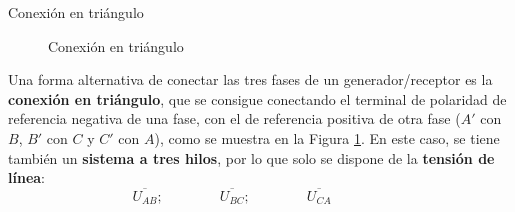 \documentclass[11pt]{book} %
\makeatletter
\numberwithin{dummy}{section}
\theoremstyle{ocrenumbox}
\theoremstyle{blacknumex}
\theoremstyle{blacknumbox}
\theoremstyle{ocrenum}
\renewcommand{\subsection}{\@startsection {subsection}{2}{\z@}
{-3ex \@plus -0.1ex \@minus -.4ex}
{0.5ex \@plus.2ex }
{\normalfont\sffamily\bfseries}}
\makeatother
\begin{document}
	\subsection{Conexión en triángulo}
	
	\begin{figure}[htbp]
		\centering
		\hfill
		\caption{Conexión en triángulo}
		\label{fig.conexion_triangulo}
	\end{figure}
	
	Una forma alternativa de conectar las tres fases de un generador/receptor es la \textbf{conexión en triángulo}, que se consigue conectando el terminal de polaridad de referencia negativa de una fase, con el de referencia positiva de otra fase ($A'$ con $B$, $B'$ con $C$ y $C'$ con $A$), como se muestra en la Figura \ref{fig.conexion_triangulo}. En este caso, se tiene también un \textbf{sistema a tres hilos}, por lo que solo se dispone de la \textbf{tensión de línea}: 
	\begin{equation*}
	    \overline{U_{AB}};\qquad\qquad \overline{U_{BC}};\qquad\qquad \overline{U_{CA}}\qquad\qquad
	\end{equation*}
	
\end{document}
